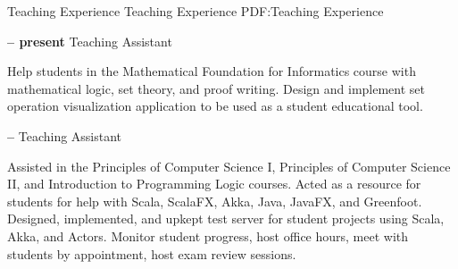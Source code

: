 \Section
{Teaching Experience}
{Teaching Experience}
{PDF:Teaching Experience}

\Entry
\UMassTitle
\dotfill
\textbf{ -- present}
\SubEntry
\Gap
Teaching Assistant
\begin{Detail}
    \SubBulletItem
    Help students in the Mathematical Foundation for Informatics course with mathematical logic, set theory, and proof writing.
    \SubBulletItem
    Design and implement set operation visualization application to be used as a student educational tool.
\end{Detail}

\BigGap
\Entry
\TrinityTitle
\dotfill
\textbf{ -- }
\SubEntry
\Gap
Teaching Assistant
\begin{Detail}
    \SubBulletItem
    Assisted in the Principles of Computer Science I, Principles of Computer Science II, and Introduction to Programming Logic courses.
    \SubBulletItem
    Acted as a resource for students for help with Scala, ScalaFX, Akka, Java, JavaFX, and Greenfoot.
    \SubBulletItem
    Designed, implemented, and upkept test server for student projects using Scala, Akka, and Actors.
    \SubBulletItem
    Monitor student progress, host office hours, meet with students by appointment, host exam review sessions.
\end{Detail}
